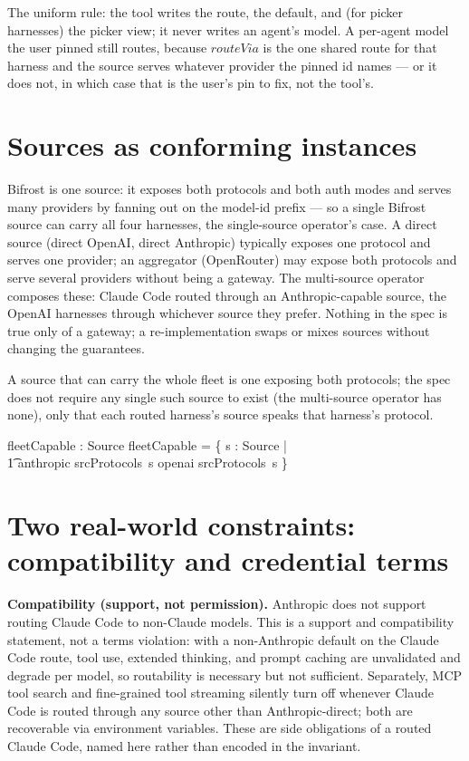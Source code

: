 \documentclass{article}
\begin{document}
The uniform rule: the tool writes the route, the default, and (for picker
harnesses) the picker view; it never writes an agent's model. A per-agent model
the user pinned still routes, because $routeVia$ is the one shared route for that
harness and the source serves whatever provider the pinned id names --- or it
does not, in which case that is the user's pin to fix, not the tool's.

\section{Sources as conforming instances}

Bifrost is one source: it exposes both protocols and both auth modes and serves
many providers by fanning out on the model-id prefix --- so a single Bifrost
source can carry all four harnesses, the single-source operator's case. A
direct source (direct OpenAI, direct Anthropic) typically exposes one protocol
and serves one provider; an aggregator (OpenRouter) may expose both protocols and
serve several providers without being a gateway. The multi-source operator
composes these: Claude Code routed through an Anthropic-capable source, the
OpenAI harnesses through whichever source they prefer. Nothing in the spec is
true only of a gateway; a re-implementation swaps or mixes sources without
changing the guarantees.

A source that can carry the whole fleet is one exposing both protocols; the spec
does not require any single such source to exist (the multi-source operator has
none), only that each routed harness's source speaks that harness's protocol.

\begin{axdef}
	fleetCapable : \power Source
	\where
	fleetCapable = \{ s : Source | \\
	\t1 anthropic \in srcProtocols~s \land openai \in srcProtocols~s \}
\end{axdef}

\section{Two real-world constraints: compatibility and credential terms}

\textbf{Compatibility (support, not permission).} Anthropic does not support
routing Claude Code to non-Claude models. This is a support and compatibility
statement, not a terms violation: with a non-Anthropic default on the Claude Code
route, tool use, extended thinking, and prompt caching are unvalidated and
degrade per model, so routability is necessary but not sufficient. Separately,
MCP tool search and fine-grained tool streaming silently turn off whenever Claude
Code is routed through any source other than Anthropic-direct; both are
recoverable via environment variables. These are side obligations of a routed
Claude Code, named here rather than encoded in the invariant.
\end{document}
